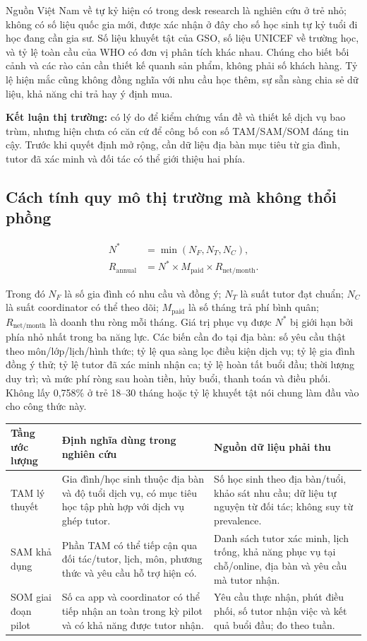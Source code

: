 \documentclass[11pt,a4paper]{article}
\begin{document}
Nguồn Việt Nam về tự kỷ hiện có trong desk research là nghiên cứu ở trẻ nhỏ;
không có số liệu quốc gia mới, được xác nhận ở đây cho số học sinh tự kỷ tuổi
đi học đang cần gia sư. Số liệu khuyết tật của GSO, số liệu UNICEF về trường
học, và tỷ lệ toàn cầu của WHO có đơn vị phân tích khác nhau. Chúng cho biết
bối cảnh và các rào cản cần thiết kế quanh sản phẩm, không phải số khách hàng.
Tỷ lệ hiện mắc cũng không đồng nghĩa với nhu cầu học thêm, sự sẵn sàng chia sẻ
dữ liệu, khả năng chi trả hay ý định mua.

\textbf{Kết luận thị trường:} có lý do để kiểm chứng vấn đề và thiết kế dịch vụ
bao trùm, nhưng hiện chưa có căn cứ để công bố con số TAM/SAM/SOM đáng tin cậy.
Trước khi quyết định mở rộng, cần dữ liệu địa bàn mục tiêu từ gia đình, tutor
đã xác minh và đối tác có thể giới thiệu hai phía.

\subsection{Cách tính quy mô thị trường mà không thổi phồng}

\begin{align*}
N^* &= \min(N_F,N_T,N_C),\\
R_{\text{annual}} &= N^* \times M_{\text{paid}} \times R_{\text{net/month}}.
\end{align*}

Trong đó $N_F$ là số gia đình có nhu cầu và đồng ý; $N_T$ là suất tutor đạt
chuẩn; $N_C$ là suất coordinator có thể theo dõi; $M_{\text{paid}}$ là số
tháng trả phí bình quân; $R_{\text{net/month}}$ là doanh thu ròng mỗi tháng.
Giá trị phục vụ được $N^*$ bị giới hạn bởi phía nhỏ nhất trong ba năng lực.
Các biến cần đo tại địa bàn: số yêu cầu thật theo môn/lớp/lịch/hình thức; tỷ
lệ qua sàng lọc điều kiện dịch vụ; tỷ lệ gia đình đồng ý thử; tỷ lệ tutor đã
xác minh nhận ca; tỷ lệ hoàn tất buổi đầu; thời lượng duy trì; và mức phí ròng
sau hoàn tiền, hủy buổi, thanh toán và điều phối. Không lấy 0,758\% ở trẻ
18--30 tháng hoặc tỷ lệ khuyết tật nói chung làm đầu vào cho công thức này.

\begin{tabularx}{\textwidth}{p{3.0cm}p{6.3cm}Y}
\toprule
\textbf{Tầng ước lượng} & \textbf{Định nghĩa dùng trong nghiên cứu} &
\textbf{Nguồn dữ liệu phải thu} \\
\midrule
TAM lý thuyết & Gia đình/học sinh thuộc địa bàn và độ tuổi dịch vụ, có mục
tiêu học tập phù hợp với dịch vụ ghép tutor. & Số học sinh theo địa bàn/tuổi,
khảo sát nhu cầu; dữ liệu tự nguyện từ đối tác; không suy từ prevalence. \\
SAM khả dụng & Phần TAM có thể tiếp cận qua đối tác/tutor, lịch, môn, phương
thức và yêu cầu hỗ trợ hiện có. & Danh sách tutor xác minh, lịch trống, khả
năng phục vụ tại chỗ/online, địa bàn và yêu cầu mà tutor nhận. \\
SOM giai đoạn pilot & Số ca app và coordinator có thể tiếp nhận an toàn trong
kỳ pilot và có khả năng được tutor nhận. & Yêu cầu thực nhận, phút điều phối,
số tutor nhận việc và kết quả buổi đầu; đo theo tuần. \\
\bottomrule
\end{tabularx}
\end{document}
